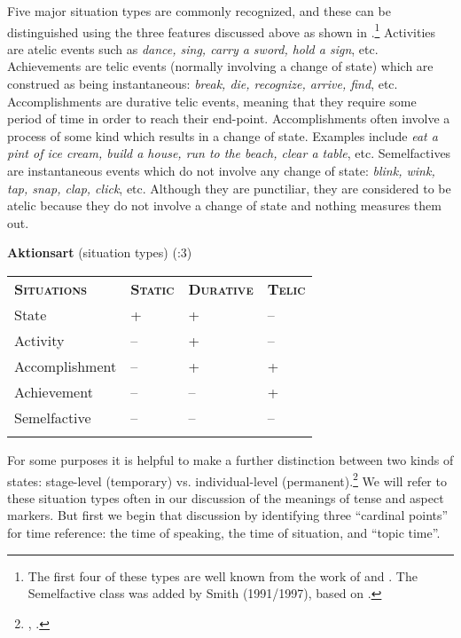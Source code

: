 Five major situation types are commonly recognized, and these can be distinguished using the three features discussed above as shown in .\footnote{The first four of these types are well known from the work of \citet{Dowty1979} and \citet{Vendler1957}. The Semelfactive class was added by Smith (1991/1997), based on \citet[42]{Comrie1976}.} Activities are atelic events such as \textit{dance, sing, carry a sword, hold a sign}, etc. Achievements are telic events (normally involving a change of state) which are construed as being instantaneous: \textit{break, die, recognize, arrive, find}, etc. Accomplishments are durative telic events, meaning that they require some period of time in order to reach their end-point. Accomplishments often involve a process of some kind which results in a change of state. Examples include \textit{eat a pint of ice cream, build a house, run to the beach, clear a table}, etc. Semelfactives are instantaneous events which do not involve any change of state: \textit{blink, wink, tap, snap, clap, click}, etc. Although they are punctiliar, they are considered to be atelic because they do not involve a change of state and nothing measures them out.


\textbf{Aktionsart} (situation types) (\citealt{Smith1997}:3)

\begin{tabularx}{\textwidth}{XXXX}
\lsptoprule

\bfseries\scshape Situations & \bfseries\scshape Static & \bfseries\scshape Durative & \bfseries\scshape Telic\\
State & + & + & –\footnotemark{}\\
Activity & – & + & –\\
Accomplishment & – & + & +\\
Achievement & – & – & +\\
Semelfactive & – & – & –\\
\lspbottomrule
\end{tabularx}

For some purposes it is helpful to make a further distinction between two kinds of states: stage-level (temporary) vs. individual-level (permanent).\footnote{\citet{Carlson1977}, \citet{Kratzer1995}.} We will refer to these situation types often in our discussion of the meanings of tense and aspect markers. But first we begin that discussion by identifying three “cardinal points” for time reference: the time of speaking, the time of situation, and “topic time”.


